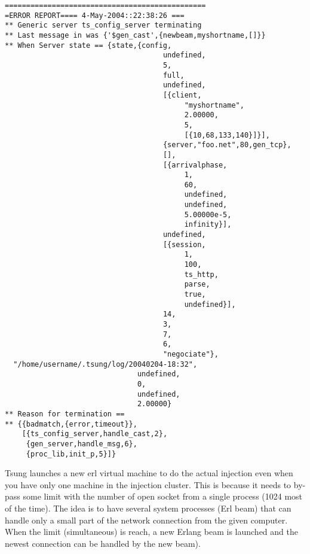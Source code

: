 \documentclass{IDXDOC-en}
\begin{document}
\begin{appendix}
\begin{Verbatim}
===============================================
=ERROR REPORT==== 4-May-2004::22:38:26 ===
** Generic server ts_config_server terminating
** Last message in was {'$gen_cast',{newbeam,myshortname,[]}}
** When Server state == {state,{config,
                                     undefined,
                                     5,
                                     full,
                                     undefined,
                                     [{client,
                                          "myshortname",
                                          2.00000,
                                          5,
                                          [{10,68,133,140}]}],
                                     {server,"foo.net",80,gen_tcp},
                                     [],
                                     [{arrivalphase,
                                          1,
                                          60,
                                          undefined,
                                          undefined,
                                          5.00000e-5,
                                          infinity}],
                                     undefined,
                                     [{session,
                                          1,
                                          100,
                                          ts_http,
                                          parse,
                                          true,
                                          undefined}],
                                     14,
                                     3,
                                     7,
                                     6,
                                     "negociate"},
  "/home/username/.tsung/log/20040204-18:32",
                               undefined,
                               0,
                               undefined,
                               2.00000}
** Reason for termination ==
** {{badmatch,{error,timeout}},
    [{ts_config_server,handle_cast,2},
     {gen_server,handle_msg,6},
     {proc_lib,init_p,5}]}
\end{Verbatim}

Tsung launches a new erl virtual machine to do the actual
injection even when you have only one machine in the injection
cluster. This is because it needs to by-pass some limit with the number
of open socket from a single process (1024 most of the time). The idea
is to have several system processes (Erl beam) that can handle only a
small part of the network connection from the given computer. When the
 limit (simultaneous) is reach, a new Erlang beam is launched
and the newest connection can be handled by the new beam).


\end{appendix}
\end{document}
